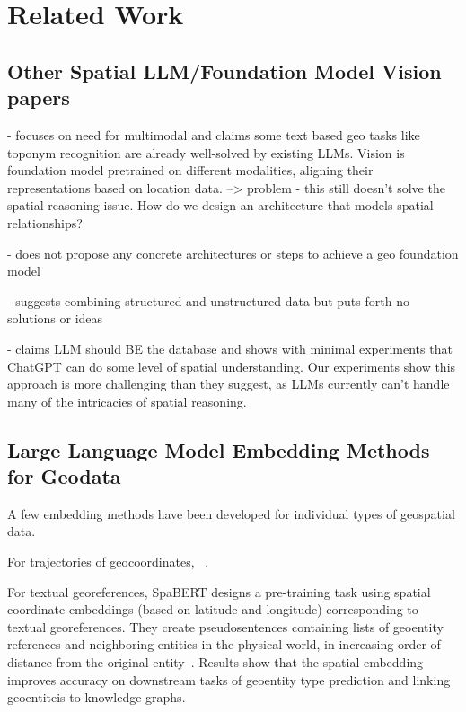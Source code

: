 \section{Related Work}
\label{section:related}
\normalsize

\subsection{Other Spatial LLM/Foundation Model Vision papers}

\cite{Mai2023} - focuses on need for multimodal and claims some text based geo tasks like toponym recognition are already well-solved by existing LLMs.
Vision is foundation model pretrained on different modalities, aligning their representations based on location data.
--> problem - this still doesn't solve the spatial reasoning issue. How  do we design an architecture that models spatial relationships?

\cite{Xie2023} - does not propose any concrete architectures or steps to achieve a geo foundation model

\cite{Tan2023} - suggests combining structured and unstructured data but puts forth no solutions or ideas

\cite{Qi2023} - claims LLM should BE the database and shows with minimal experiments that ChatGPT can do some level of spatial understanding. 
Our experiments show this approach is more challenging than they suggest, as LLMs currently can't handle many of the intricacies of spatial reasoning.




\subsection{Large Language Model Embedding Methods for Geodata}
A few embedding methods have been developed for individual types of geospatial data.

For trajectories of geocoordinates, ~\cite{Hu2023}.

For textual georeferences, SpaBERT designs a pre-training task using spatial coordinate embeddings (based on latitude and longitude) corresponding to textual georeferences.
They create pseudosentences containing lists of geoentity references and neighboring entities in the physical world, in increasing order of distance from the original entity~\cite{Li2021}.
Results show that the spatial embedding improves accuracy on downstream tasks of geoentity type prediction and linking geoentiteis to knowledge graphs.

